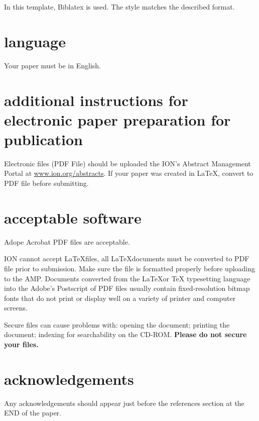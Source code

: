 \documentclass[letterpaper,times]{IONconf}
\begin{document}
In this template, Biblatex is used. The style \verb|| matches the described format.


\section{language}

Your paper must be in English.

\section{additional instructions for electronic paper preparation for publication}

Electronic files (PDF File) should be uploaded the ION’s Abstract Management Portal at \url{www.ion.org/abstracts}. If your paper was created in \LaTeX, convert to PDF file before submitting.


\section{acceptable software}

Adope Acrobat PDF files are acceptable.

ION cannot accept \LaTeX files, all \LaTeX documents must be converted to PDF file prior to submission. Make sure the file is formatted properly before uploading to the AMP.  Documents converted from the \LaTeX or TeX typesetting language into the Adobe’s Postscript of PDF files usually contain fixed-resolution bitmap fonts that do not print or display well on a variety of printer and computer screens.  

Secure files can cause problems with: opening the document; printing the document; indexing for searchability on the CD-ROM. \textbf{\large{Please do not secure your files.}}


\section*{acknowledgements}

Any acknowledgements should appear just before the references section at the END of the paper.



\end{document}
